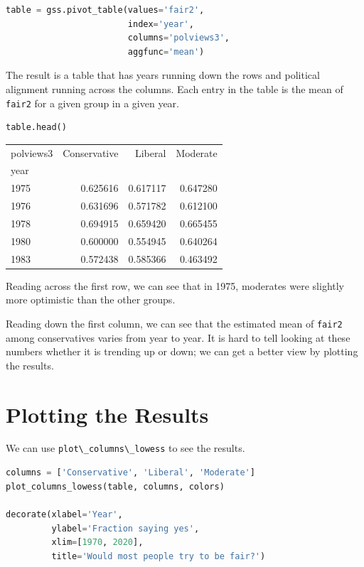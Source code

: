 \begin{lstlisting}[language=Python]
table = gss.pivot_table(values='fair2', 
                        index='year', 
                        columns='polviews3', 
                        aggfunc='mean')
\end{lstlisting}

The result is a table that has years running down the rows and political
alignment running across the columns. Each entry in the table is the
mean of \passthrough{\lstinline!fair2!} for a given group in a given
year.

\begin{lstlisting}[language=Python]
table.head()
\end{lstlisting}

\begin{tabular}{lrrr}
\toprule
polviews3 &  Conservative &   Liberal &  Moderate \\
year &               &           &           \\
\midrule
1975 &      0.625616 &  0.617117 &  0.647280 \\
1976 &      0.631696 &  0.571782 &  0.612100 \\
1978 &      0.694915 &  0.659420 &  0.665455 \\
1980 &      0.600000 &  0.554945 &  0.640264 \\
1983 &      0.572438 &  0.585366 &  0.463492 \\
\bottomrule
\end{tabular}

Reading across the first row, we can see that in 1975, moderates were
slightly more optimistic than the other groups.

Reading down the first column, we can see that the estimated mean of
\passthrough{\lstinline!fair2!} among conservatives varies from year to
year. It is hard to tell looking at these numbers whether it is trending
up or down; we can get a better view by plotting the results.

\hypertarget{plotting-the-results}{%
\section{Plotting the Results}\label{plotting-the-results}}

We can use \passthrough{\lstinline!plot\_columns\_lowess!} to see the
results.

\begin{lstlisting}[language=Python]
columns = ['Conservative', 'Liberal', 'Moderate']
plot_columns_lowess(table, columns, colors)

decorate(xlabel='Year',
         ylabel='Fraction saying yes',
         xlim=[1970, 2020],
         title='Would most people try to be fair?')
\end{lstlisting}

